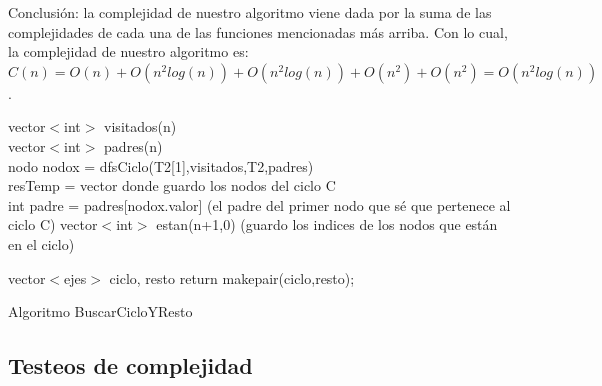 \documentclass[11pt, a4paper, twoside]{article}
\begin{document}
\begin{enumerate}
\end{enumerate}

Conclusión: la complejidad de nuestro algoritmo viene dada por la suma de las complejidades de cada
una de las funciones mencionadas más arriba. Con lo cual, la complejidad de nuestro algoritmo es: 
$ C(n) = O(n) + O(n^2 log(n)) + O(n^2 log(n)) + O(n^2) + O(n^2) = O(n^2 log(n))$. 

\begin{algorithm}[H]
          
          vector$<$int$>$ visitados(n) \\
          vector$<$int$>$ padres(n) \\
          nodo nodox = dfsCiclo(T2[1],visitados,T2,padres) \\     
          resTemp = vector donde guardo los nodos del ciclo C \\
          int padre = padres[nodox.valor] (el padre del primer nodo que sé que pertenece al ciclo C)
		  vector$<$int$>$ estan(n+1,0) (guardo los indices de los nodos que están en el ciclo) \\
		  
		  vector$<$ejes$>$ ciclo, resto
		  return makepair(ciclo,resto);
		  
\caption{Algoritmo BuscarCicloYResto}
\end{algorithm}

\subsection{Testeos de complejidad}
\end{document}
